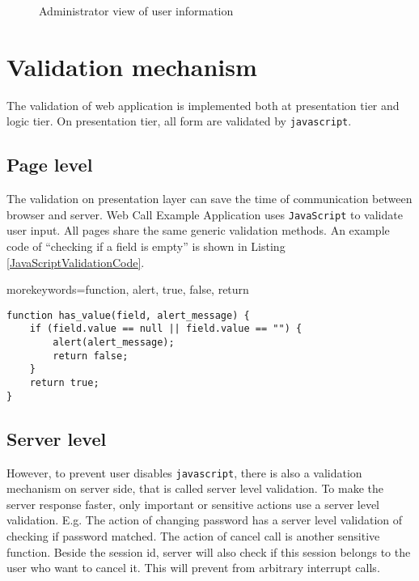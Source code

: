 \begin{figure}[!hbtp]
\centering
{}
\caption{Administrator view of user information}
\label{fig:AdministratorViewOfUserInformation}
\end{figure} 

\section{Validation mechanism}
\label{sec:WebApplication:ValidationMechanism}

The validation of web application is implemented both at presentation tier and logic tier. On presentation tier, all form are validated by \texttt{javascript}. 

\subsection{Page level}
\label{sec:WebApplication:ValidationMechanism:PageLevel}

The validation on presentation layer can save the time of communication between browser and server. Web Call Example Application uses \texttt{JavaScript} to validate user input. All pages share the same generic validation methods. An example code of ``checking if a field is empty'' is shown in Listing \ref{JavaScriptValidationCode}.

{morekeywords={function, alert, true, false, return}}
\lstset{language=Java}

\begin{lstlisting}[frame=lines, float=!bph, caption=JavaScript validation code, label=JavaScriptValidationCode]
function has_value(field, alert_message) {
    if (field.value == null || field.value == "") {
        alert(alert_message);
        return false;
    }
    return true;
}
\end{lstlisting}

\subsection{Server level}
\label{sec:WebApplication:ValidationMechanism:ServerLevel}

However, to prevent user disables \texttt{javascript}, there is also a validation mechanism on server side, that is called server level validation. To make the server response faster, only important or sensitive actions use a server level validation. E.g. The action of changing password has a server level validation of checking if password matched. The action of cancel call is another sensitive function. Beside the session id, server will also check if this session belongs to the user who want to cancel it. This will prevent from arbitrary interrupt calls.

